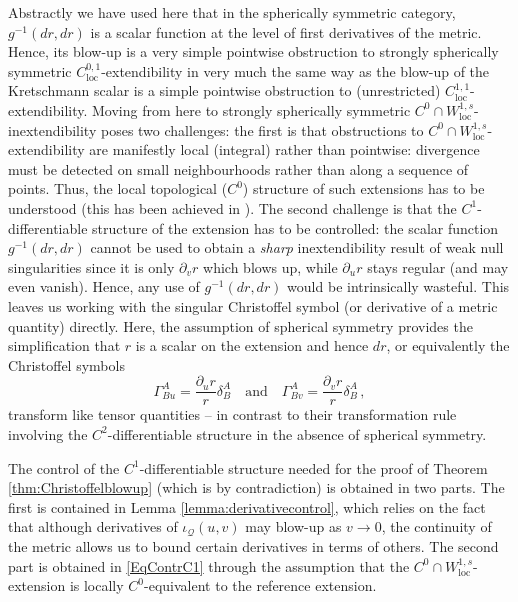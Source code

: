\documentclass{article}
\newcommand{\Q}{\mathcal{Q}}
\newcommand{\loc}{\mathrm{loc}}
\newcommand{\rd}{\partial}
\begin{document}
Abstractly we have used here that in the spherically symmetric category, $g^{-1}(dr,dr)$ is a scalar function at the level of first derivatives of the metric. Hence, its blow-up is a very simple pointwise obstruction to strongly spherically symmetric $C^{0,1}_{\loc}$-extendibility in very much the same way as the blow-up of the Kretschmann scalar is a simple pointwise obstruction to (unrestricted) $C^{1,1}_{\loc}$-extendibility. Moving from here to strongly spherically symmetric $C^0 \cap W^{1,s}_{\loc}$-inextendibility poses two challenges: the first is that obstructions to $C^0 \cap W^{1,s}_{\loc}$-extendibility are manifestly local (integral) rather than pointwise: divergence must be detected on small neighbourhoods rather than %
along a sequence of points. Thus, the local topological ($C^0$) structure of such extensions has to be understood (this has been achieved in \cite{CameronSbierski}). The second challenge is that the $C^1$-differentiable structure of the extension has to be controlled: the scalar function $g^{-1}(dr,dr)$ cannot be used to obtain a \emph{sharp} inextendibility result of weak null singularities since it is only $\rd_v r$ which blows up, while $\rd_u r$ stays regular (and may even vanish). Hence, any use of $g^{-1}(dr,dr)$ would be intrinsically wasteful. This leaves us working with the singular Christoffel symbol (or derivative of a metric quantity) directly. Here, the assumption of spherical symmetry provides the simplification that $r$ is a scalar on the extension and hence $dr$, or equivalently the Christoffel symbols
\begin{equation}
    \Gamma^A_{Bu}=\frac{\partial_ur}{r} \delta^A_B\quad\text{and}\quad\Gamma^A_{Bv}=\frac{\partial_vr}{r} \delta^A_B\,,
\end{equation}
transform like tensor quantities -- in contrast to their transformation rule involving the $C^2$-differentiable structure in the absence of spherical symmetry. 

The control of the $C^1$-differentiable structure needed for the proof of Theorem \ref{thm:Christoffelblowup} (which is by contradiction) is obtained in two parts. The first is contained in Lemma \ref{lemma:derivativecontrol}, which relies on the fact that although derivatives of $\iota_\Q(u,v)$ may blow-up as $v\to0$, the continuity of the metric allows us to bound certain derivatives in terms of others. The second part is obtained in \eqref{EqContrC1} through the assumption that the $C^0\cap W^{1,s}_{\loc}$-extension is locally $C^0$-equivalent to the reference extension. 
\end{document}
